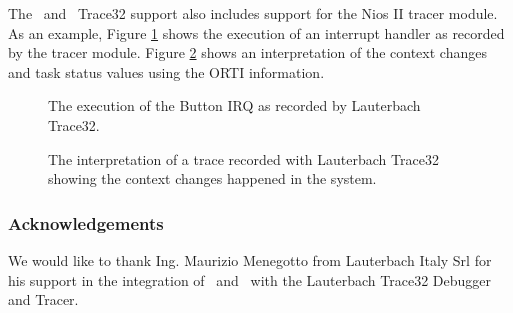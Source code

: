 The \rtd\ and \ee\ Trace32 support also includes support for the Nios
II tracer module. As an example, Figure \ref{fig:trace32_chart_irq}
shows the execution of an interrupt handler as recorded by the tracer
module. Figure \ref{fig:trace32_chart_state} shows an interpretation
of the context changes and task status values using the ORTI
information.

%
\begin{figure}
\caption{\label{fig:trace32_chart_irq} The execution of the Button IRQ
as recorded by Lauterbach Trace32.}
\end{figure}

%
\begin{figure}
\caption{\label{fig:trace32_chart_state} The interpretation of a trace
recorded with Lauterbach Trace32 showing the context changes happened
in the system.}
\end{figure}

\subsubsection{Acknowledgements}

We would like to thank Ing. Maurizio Menegotto from Lauterbach Italy
Srl for his support in the integration of \rtd\ and \ee\ with the
Lauterbach Trace32 Debugger and Tracer.


